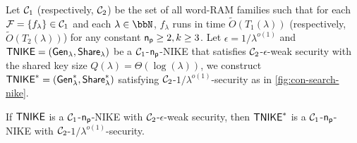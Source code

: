 Let $\mathcal{C}_1$ (respectively, $\mathcal{C}_2$) be the set of all word-RAM families such that for each $\mathcal{F} = \{f_{\lambda}\}\in\mathcal{C}_1$ and each $\lambda\in\N$, $f_{\lambda}$ runs in time $\tilde{O}(T_1(\lambda))$ (respectively, $\tilde{O}(T_2(\lambda))$) for any constant $\mathsf{n_p} \geq 2, k \geq 3$. Let $\epsilon =1/ \lambda^{o(1)}$ and $\mathsf{TNIKE} = ({\mathsf{Gen}}_\lambda, {\mathsf{Share}}_\lambda)$ be a $\mathcal{C}_1$-$\mathsf{n_p}$-NIKE that satisfies $\mathcal{C}_2$-$\epsilon$-weak security with the shared key size $ Q(\lambda) = \Theta(\log(\lambda))$, we construct $\mathsf{TNIKE}^* = ({\mathsf{Gen}}_\lambda^*, {\mathsf{Share}}_\lambda^*)$ satisfying $\mathcal{C}_2$-$1/ \lambda^{o(1)}$-security as in \cref{fig:con-search-nike}.
\begin{theorem}
\label{thm:hcp}
	If $\mathsf{TNIKE}$ is a $\mathcal{C}_1$-$\mathsf{n_p}$-NIKE with $\mathcal{C}_2$-$\epsilon$-weak security, then $\mathsf{TNIKE}^*$ is a $\mathcal{C}_1$-$\mathsf{n_p}$-NIKE with $\mathcal{C}_2$-$1/ \lambda^{o(1)}$-security.
\end{theorem}
